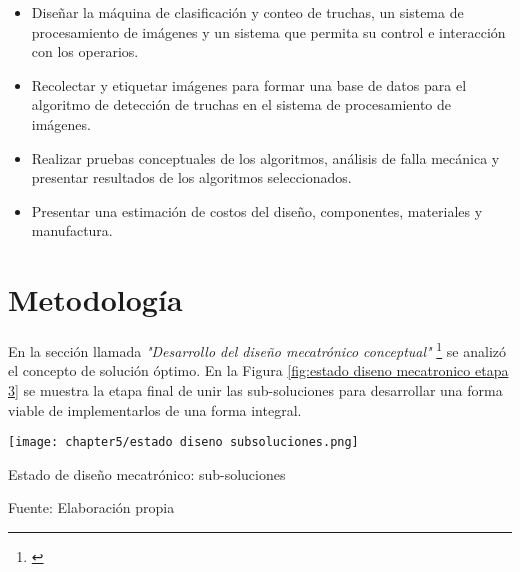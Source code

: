 \begin{itemize}
	\item Diseñar la máquina de clasificación y conteo de truchas, un sistema de procesamiento de imágenes y un sistema que permita su control e interacción con los operarios.
	\item Recolectar y etiquetar imágenes para formar una base de datos para el algoritmo de detección de truchas en el sistema de procesamiento de imágenes.
	\item Realizar pruebas conceptuales de los algoritmos, análisis de falla mecánica y presentar resultados de los algoritmos seleccionados.
	\item Presentar una estimación de costos del diseño, componentes, materiales y manufactura.
\end{itemize}



\section{Metodología}

En la sección llamada \textit{"Desarrollo del diseño mecatrónico conceptual"} \footnote{\cite{DiazVergara2020}} se analizó el concepto de solución óptimo. En la Figura \ref{fig:estado diseno mecatronico etapa 3} se muestra la etapa final de unir las sub-soluciones para desarrollar una forma viable de implementarlos de una forma integral.

\begin{myfigure}[H]
	\footnotesize\centering
	\texttt{[image: chapter5/estado diseno subsoluciones.png]}
	\caption{Estado de diseño mecatrónico: sub-soluciones}
	\begin{myflushcenter}
		Fuente: Elaboración propia
	\end{myflushcenter}
	\label{fig:estado diseno mecatronico etapa 3}
\end{myfigure}

